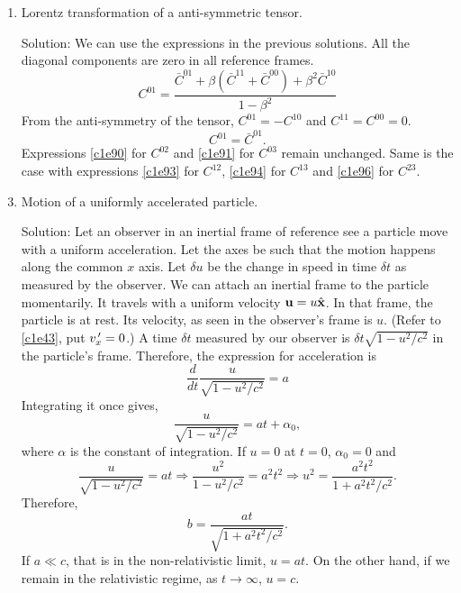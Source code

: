 \begin{enumerate}
\item Lorentz transformation of a anti-symmetric tensor. 
\item[Solution:] We can use the expressions in the previous solutions. All the
diagonal components are zero in all reference frames. 
\[
C^{01} = \frac{\bar{C}^{01} + \beta(\bar{C}^{11} + 
\bar{C}^{00}) + \beta^2\bar{C}^{10}}{1 - \beta^2}
\]
From the anti-symmetry of the tensor, $C^{01} = -C^{10}$ and $C^{11} = C^{00} 
= 0$.
\begin{equation}\label{c1e98}
C^{01} = \bar{C}^{01}.
\end{equation}
Expressions \eqref{c1e90} for $C^{02}$ and \eqref{c1e91} for $C^{03}$ remain
unchanged. Same is the case with expressions \eqref{c1e93} for $C^{12}$, 
\eqref{c1e94} for $C^{13}$ and \eqref{c1e96} for $C^{23}$.

\item Motion of a uniformly accelerated particle.
\item[Solution:] Let an observer in an inertial frame of reference see a 
particle move with a uniform acceleration. Let the axes be such that the 
motion happens along the common $x$ axis. Let $\delta u$ be the change in 
speed in time $\delta t$ as measured by the observer. We can attach an 
inertial frame to the particle momentarily. It travels with a uniform velocity 
$\mathbf{u} = u\hat{\mathbf{x}}$. In that frame, the particle is at rest. Its velocity, as 
seen in the observer's frame is $u$. (Refer to \eqref{c1e43}, put 
$v_x^{\,\prime} = 0$.) A time $\delta t$ measured by our observer is $\delta t
\sqrt{1 - u^2/c^2}$ in the particle's frame. Therefore, the expression for 
acceleration is
\begin{equation}\label{c1e99}
\frac{d}{dt}\frac{u}{\sqrt{1 - u^2/c^2}} = a
\end{equation}
Integrating it once gives,
\begin{equation}\label{c1e100}
\frac{u}{\sqrt{1 - u^2/c^2}} = at + \alpha_0,
\end{equation}
where $\alpha$ is the constant of integration. If $u = 0$ at $t = 0$, 
$\alpha_0 = 0$ and
\[
\frac{u}{\sqrt{1 - u^2/c^2}} = at \Rightarrow \frac{u^2}{1 - u^2/c^2} = a^2t^2
\Rightarrow u^2 = \frac{a^2t^2}{1 + a^2t^2/c^2}.
\]
Therefore,
\begin{equation}\label{c1e101}b = \frac{at}{\sqrt{1 + a^2t^2/c^2}}.
\end{equation}
If $a \ll c$, that is in the non-relativistic limit, $u = at$. On the other hand,
if we remain in the relativistic regime, as $t \rightarrow \infty$, $u = c$.


\end{enumerate}
